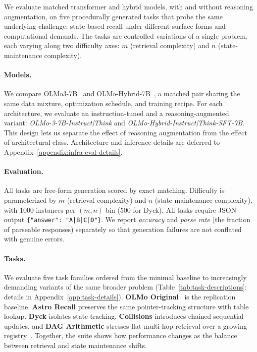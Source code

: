 \documentclass[11pt]{article}
\theoremstyle{definition}
\begin{document}
We evaluate matched transformer and hybrid models, with and without reasoning augmentation, on five procedurally generated tasks that probe the same underlying challenge: state-based recall under different surface forms and computational demands. The tasks are controlled variations of a single problem, each varying along two difficulty axes: $m$ (retrieval complexity) and $n$ (state-maintenance complexity).

\paragraph{Models.} We compare OLMo3-7B~\cite{olmo2025olmo3} and OLMo-Hybrid-7B~\cite{merrill2026olmo}, a matched pair sharing the same data mixture, optimization schedule, and training recipe. For each architecture, we evaluate an instruction-tuned and a reasoning-augmented variant: \textit{OLMo-3-7B-Instruct|Think} and \textit{OLMo-Hybrid-Instruct|Think-SFT-7B}. This design lets us separate the effect of reasoning augmentation from the effect of architectural class. Architecture and inference details are deferred to Appendix~\ref{appendix:infra-eval-details}.

\paragraph{Evaluation.} All tasks are free-form generation scored by exact matching. Difficulty is parameterized by $m$ (retrieval complexity) and $n$ (state maintenance complexity), with 1000 instances per $(m,n)$ bin (500 for Dyck). All tasks require JSON output \texttt{\{"answer": "A|B|C|D"\}}. We report \textit{accuracy} and \textit{parse rate} (the fraction of parseable responses) separately so that generation failures are not conflated with genuine errors.

\paragraph{Tasks.} We evaluate five task families ordered from the minimal baseline to increasingly demanding variants of the same broader problem (Table~\ref{tab:task-descriptions}; details in Appendix~\ref{app:task-details}). \textbf{OLMo Original}~\cite{merrill2026olmo} is the replication baseline. \textbf{Astro Recall} preserves the same pointer-tracking structure with table lookup. \textbf{Dyck} isolates state-tracking. \textbf{Collisions} introduces chained sequential updates, and \textbf{DAG Arithmetic} stresses flat multi-hop retrieval over a growing registry~\cite{motwani2026longcot}. Together, the suite shows how performance changes as the balance between retrieval and state maintenance shifts.
\end{document}
